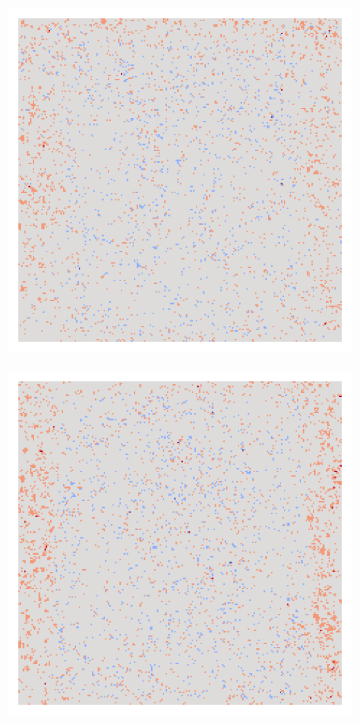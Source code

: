 \begin{figure}[H]
    \centering
        \begin{subfigure}{0.19\linewidth}
            \centering
            \includegraphics[height=1\linewidth]{01-images/05-resultate/uap_resnet18/uap0-resnet18-mri_data-n200-robustificationslevel0.png}
        \end{subfigure}\hfill%
        \begin{subfigure}{0.19\linewidth}
            \centering
            \includegraphics[height=1\linewidth]{01-images/05-resultate/uap_resnet18/uap1-resnet18-mri_data-n200-robustificationslevel0.png}

\end{subfigure}
\end{figure}
